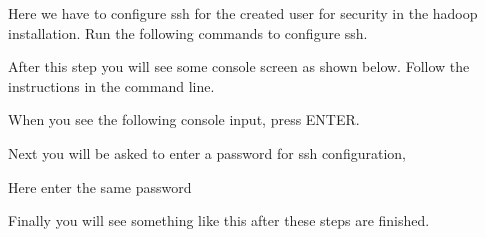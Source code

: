 Here we have to configure ssh for the created user for security in the
hadoop installation. Run the following commands to configure ssh.

\begin{Shaded}
\begin{Highlighting}[]
\NormalTok{$ } 
\end{Highlighting}
\end{Shaded}

\begin{Shaded}
\begin{Highlighting}[]
\NormalTok{$ } 
\end{Highlighting}
\end{Shaded}

After this step you will see some console screen as shown below. Follow
the instructions in the command line.

When you see the following console input, press ENTER.

\begin{Shaded}
\begin{Highlighting}[]
 \KeywordTok{:}
\end{Highlighting}
\end{Shaded}

Next you will be asked to enter a password for ssh configuration,

\begin{Shaded}
\begin{Highlighting}[]
 \KeywordTok{:}
\end{Highlighting}
\end{Shaded}

Here enter the same password

\begin{Shaded}
\begin{Highlighting}[]
 
\end{Highlighting}
\end{Shaded}

Finally you will see something like this after these steps are finished.

